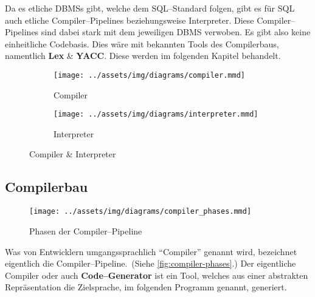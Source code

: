 Da es etliche \acp{DBMS} gibt, welche dem \ac{SQL}--Standard folgen, gibt es für \ac{SQL} auch etliche Compiler--Pipelines beziehungsweise Interpreter.
Diese Compiler--Pipelines sind dabei stark mit dem jeweiligen \ac{DBMS} verwoben.
Es gibt also keine einheitliche Codebasis.
Dies wäre mit bekannten Tools des Compilerbaus, namentlich \textbf{Lex} \& \textbf{YACC}.
Diese werden im folgenden Kapitel behandelt.

\begin{figure}[ht]
    \begin{subfigure}[c]{0.5\textwidth}
        \begin{center}
            \texttt{[image: ../assets/img/diagrams/compiler.mmd]}
        \end{center}
        \caption{Compiler}
        \label{subfig:compiler-and-interpreter-compiler}
    \end{subfigure}
    \begin{subfigure}[c]{0.5\textwidth}
        \begin{center}
            \texttt{[image: ../assets/img/diagrams/interpreter.mmd]}
        \end{center}
        \caption{Interpreter}
        \label{subfig:compiler-and-interpreter-interpreter}
    \end{subfigure}
    \caption{Compiler \& Interpreter~\autocite{aho-2006}}
    \label{fig:compiler-and-interpreter}
\end{figure}
\newpage

\subsection{Compilerbau}\label{subsec:compilerbau}
\begin{wrapfigure}{rH}{0.5\textwidth}
    \begin{center}
        \texttt{[image: ../assets/img/diagrams/compiler\_phases.mmd]}
    \end{center}
    \caption{Phasen der Compiler--Pipeline~\autocite{aho-2006}}
    \label{fig:compiler-phases}
\end{wrapfigure}
Was von Entwicklern umgangssprachlich \enquote{Compiler} genannt wird, bezeichnet eigentlich die Compiler--Pipeline.~(Siehe \autoref{fig:compiler-phases}.)
Der eigentliche Compiler oder auch \textbf{Code--Generator} ist ein Tool, welches aus einer abstrakten Repräsentation die Zielsprache, im folgenden Programm genannt, generiert.

